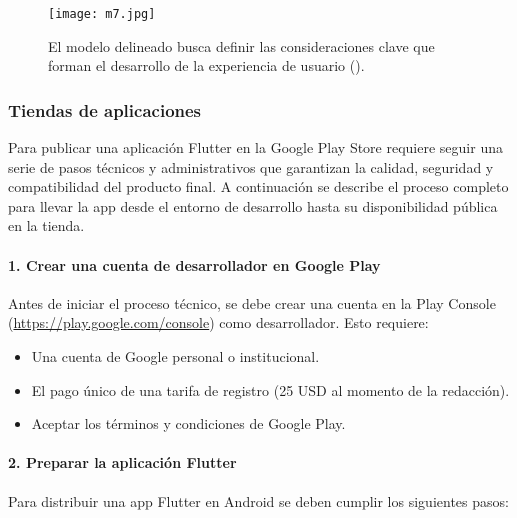 \begin{figure}[h!]
\centering
  \texttt{[image: m7.jpg]}
  \caption{El modelo delineado busca definir las consideraciones clave que forman el desarrollo de la experiencia de usuario (\cite{garrett2011elements}).}
  \label{m7}
\end{figure}

\newpage
\subsubsection*{Tiendas de aplicaciones}
Para publicar una aplicación Flutter en la Google Play Store requiere seguir una serie de pasos técnicos y administrativos que garantizan la calidad, seguridad y compatibilidad del producto final. A continuación se describe el proceso completo para llevar la app desde el entorno de desarrollo hasta su disponibilidad pública en la tienda.

\paragraph{1. Crear una cuenta de desarrollador en Google Play}

Antes de iniciar el proceso técnico, se debe crear una cuenta en la Play Console (\url{https://play.google.com/console}) como desarrollador. Esto requiere:

\begin{itemize}
    \item Una cuenta de Google personal o institucional.
    \item El pago único de una tarifa de registro (25 USD al momento de la redacción).
    \item Aceptar los términos y condiciones de Google Play.
\end{itemize}

\paragraph{2. Preparar la aplicación Flutter}

Para distribuir una app Flutter en Android se deben cumplir los siguientes pasos:

